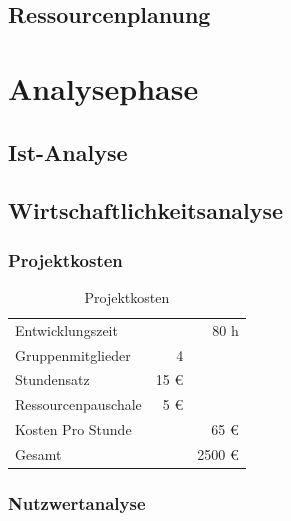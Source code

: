 \documentclass[12pt, ngerman, a4paper,toc=left, parskip=half, numbers=noenddot, headings=standardclasses, nonumberlist]{scrartcl}
\begin{document}
\subsection{Ressourcenplanung}
\newpage
\section{Analysephase}

\subsection{Ist-Analyse}

\subsection{Wirtschaftlichkeitsanalyse}

\subsubsection{Projektkosten}

\begin{table}[h]
	\begin{center}
		\begin{tabular}{l r r}
			Entwicklungszeit	&	   & 80 h   \\
			Gruppenmitglieder	&  4   &        \\
			Stundensatz      	& 15 € &        \\
			Ressourcenpauschale &  5 € &		\\
			Kosten Pro Stunde   &      & 65 €   \\
			\midrule
			\rowcolor{blue!20}
			Gesamt       		&  	   & 2500 € \\
		\end{tabular}
	\end{center}
	\caption{Projektkosten}
	\label{table:2}
\end{table}

\subsubsection{Nutzwertanalyse}
\end{document}
